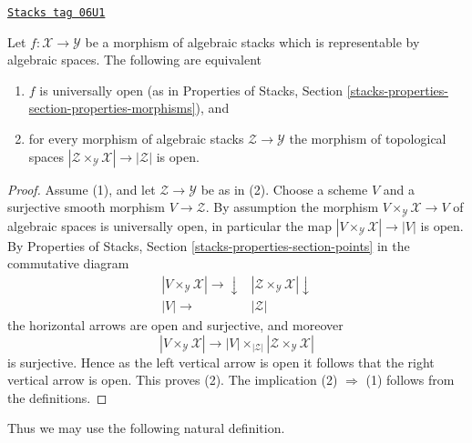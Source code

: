 \begin{lemma}
\label{stacks-morphisms-lemma-characterize-representable-universally-open}
\href{https://stacks.math.columbia.edu/tag/06U1}{\texttt{Stacks tag 06U1}}

Let $f : \mathcal{X} \to \mathcal{Y}$ be a morphism of
algebraic stacks which is representable by algebraic spaces.
The following are equivalent
\begin{enumerate}
\item $f$ is universally open (as in Properties of Stacks,
Section \ref{stacks-properties-section-properties-morphisms}), and
\item for every morphism of algebraic stacks $\mathcal{Z} \to \mathcal{Y}$
the morphism of topological spaces
$|\mathcal{Z} \times_\mathcal{Y} \mathcal{X}| \to |\mathcal{Z}|$ is open.
\end{enumerate}
\end{lemma}

\begin{proof}
Assume (1), and let $\mathcal{Z} \to \mathcal{Y}$ be as in (2).
Choose a scheme $V$ and a surjective smooth morphism $V \to \mathcal{Z}$.
By assumption the morphism $V \times_\mathcal{Y} \mathcal{X} \to V$
of algebraic spaces is universally open, in particular the map
$|V \times_\mathcal{Y} \mathcal{X}| \to |V|$ is open. By
Properties of Stacks, Section \ref{stacks-properties-section-points}
in the commutative diagram
$$
\begin{array}{cc}|V \times_\mathcal{Y} \mathcal{X}| \longrightarrow\downarrow & |\mathcal{Z} \times_\mathcal{Y} \mathcal{X}| \downarrow \\ |V| \longrightarrow & |\mathcal{Z}|\end{array}
$$
the horizontal arrows are open and surjective, and moreover
$$
|V \times_\mathcal{Y} \mathcal{X}| \longrightarrow
|V| \times_{|\mathcal{Z}|} |\mathcal{Z} \times_\mathcal{Y} \mathcal{X}|
$$
is surjective. Hence as the left vertical arrow is open it follows that
the right vertical arrow is open. This proves (2).
The implication (2) $\Rightarrow$ (1) follows from the definitions.
\end{proof}

Thus we may use the following natural definition.

